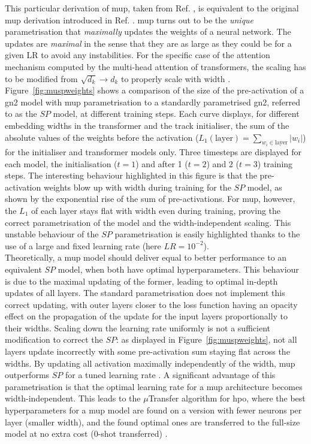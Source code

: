 This particular derivation of \gls{mup}, taken from Ref. \cite{yang2021tuning}, is equivalent to the original \gls{mup} derivation introduced in Ref. \cite{pmlr-v139-yang21c}. \gls{mup} turns out to be the \textit{unique} parametrisation that \textit{maximally} updates the weights of a neural network. The updates are \textit{maximal} in the sense that they are as large as they could be for a given LR to avoid any instabilities. For the specific case of the attention mechanism computed by the multi-head attention of transformers, the scaling has to be modified from $\sqrt{d_k} \rightarrow d_k$ to properly scale with width \cite{yang2021tuning}. Figure~\ref{fig:muspweights} shows a comparison of the size of the pre-activation of a \gls{gn2} model with \gls{mup} parametrisation to a standardly parametrised \gls{gn2}, referred to as the $SP$ model, at different training steps. Each curve displays, for different embedding widths in the transformer and the track initialiser, the sum of the absolute values of the weights before the activation ($L_1(\textrm{layer}) = \sum_{w_i \in \textrm{layer}} |w_i|$) for the initialiser and transformer models only. Three timesteps are displayed for each model, the initialisation ($t=1$) and after 1 ($t=2$) and 2 ($t=3$) training steps. The interesting behaviour highlighted in this figure is that the pre-activation weights blow up with width during training for the $SP$ model, as shown by the exponential rise of the sum of pre-activations. For \gls{mup}, however, the $L_1$ of each layer stays flat with width even during training, proving the correct parametrisation of the model and the width-independent scaling. This unstable behaviour of the $SP$ parametrisation is easily highlighted thanks to the use of a large and fixed learning rate (here $LR = 10^{-2}$). \\

Theoretically, a \gls{mup} model should deliver equal to better performance to an equivalent $SP$ model, when both have optimal hyperparameters. This behaviour is due to the maximal updating of the former, leading to optimal in-depth updates of all layers. The standard parametrisation does not implement this correct updating, with outer layers closer to the loss function having an opacity effect on the propagation of the update for the input layers proportionally to their widths. Scaling down the learning rate uniformly is not a sufficient modification to correct the $SP$: as displayed in Figure~\ref{fig:muspweights}, not all layers update incorrectly with some pre-activation sum staying flat across the widths. By updating all activation maximally independently of the width, \gls{mup} outperforms $SP$ for a tuned learning rate \cite{pmlr-v139-yang21c}. A significant advantage of this parametrisation is that the optimal learning rate for a \gls{mup} architecture becomes width-independent. This leads to the $\mu$Transfer algorithm for \gls{hpo}, where the best hyperparameters for a \gls{mup} model are found on a version with fewer neurons per layer (smaller width), and the found optimal ones are transferred to the full-size model at no extra cost (0-shot transferred) \cite{yang2021tuning}. \\


